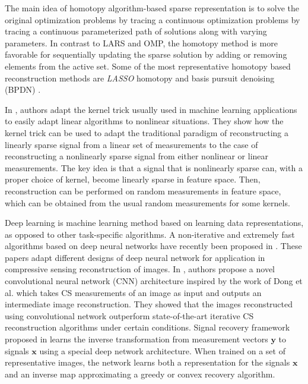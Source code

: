 \documentclass[journal]{IEEEtran}
\begin{document}
The main idea of homotopy algorithm-based sparse representation is to solve the original optimization problems by tracing a continuous optimization problems by tracing a continuous parameterized path of solutions along with varying parameters. In contrast to LARS and OMP, the homotopy method is more favorable for sequentially updating the sparse solution by adding or removing elements from the active set. Some of the most representative homotopy based reconstruction methods are \textit{LASSO} homotopy and basis pursuit denoising (BPDN) \cite{Zhang2015}.

In \cite{qi2011using}, authors adapt the kernel trick usually used in machine learning applications to easily adapt linear algorithms to nonlinear situations. They show how the kernel trick can be used to adapt the traditional paradigm of reconstructing a linearly sparse signal from a linear set of measurements to the case of reconstructing a nonlinearly sparse signal from either nonlinear or linear measurements. The key idea is that a signal that is nonlinearly sparse can, with a proper choice of kernel, become linearly sparse in feature space. Then, reconstruction can be performed on random measurements in feature space, which can be obtained from the usual random measurements for some kernels.

Deep learning is machine learning method based on learning data representations, as opposed to other task-specific algorithms. A non-iterative and extremely fast algorithms based on deep neural networks have recently been proposed in \cite{Kulkarni2016, Mousavi2017, Mousavi2015}. These papers adapt different designs of deep neural network for application in compressive sensing reconstruction of images. In \cite{Kulkarni2016}, authors propose a novel convolutional neural network (CNN) architecture inspired by the work of Dong et al. \cite{Dong2016} which takes CS measurements of an image as input and outputs an intermediate image reconstruction. They showed that the images reconstructed using convolutional network outperform state-of-the-art iterative CS reconstruction algorithms under certain conditions. Signal recovery framework proposed in \cite{Mousavi2017} learns the inverse transformation from measurement vectors $\boldsymbol{y}$ to signals $\boldsymbol{x}$ using a special deep network architecture. When trained on a set of representative images, the network learns both a representation for the signals $\boldsymbol{x}$ and an inverse map approximating a greedy or convex recovery algorithm.
\end{document}
